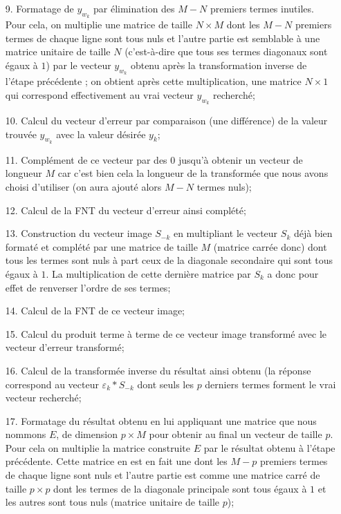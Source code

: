 \begin{itemize}
\begin{itemize}
\item[9.] Formatage de $ y_{w_{k}} $ par élimination des $ M-N $ premiers termes inutiles. Pour cela, on multiplie une matrice de taille $ N\times M $ dont les $ M-N $ premiers termes de chaque ligne sont tous nuls et l'autre partie est semblable à une matrice unitaire de taille $ N $ (c'est-à-dire que tous ses termes diagonaux sont égaux à $ 1 $) par le vecteur $ y_{w_{k}} $ obtenu après la transformation inverse de l'étape précédente ; on obtient après cette multiplication, une matrice $ N\times 1 $ qui correspond effectivement au vrai vecteur $ y_{w_{k}} $ recherché;
\item[10.] Calcul du vecteur d'erreur par comparaison (une différence) de la valeur trouvée $ y_{w_{k}} $ avec la valeur désirée $ y_{k} $;
\item[11.] Complément de ce vecteur par des 0 jusqu'à obtenir un vecteur de longueur $ M $ car c'est bien cela la longueur de la transformée que nous avons choisi d'utiliser (on aura ajouté alors $ M-N $ termes nuls);
\item[12.] Calcul de la FNT du vecteur d'erreur ainsi complété;
\item[13.] Construction du vecteur image $ S_{-k} $ en multipliant le vecteur $ S_{k} $ déjà bien formaté et complété par une matrice de taille $ M $ (matrice carrée donc) dont tous les termes sont nuls à part ceux de la diagonale secondaire qui sont tous égaux à $ 1 $. La multiplication de cette dernière matrice par $ S_{k} $ a donc pour effet de renverser l'ordre de ses termes;
\item[14.] Calcul de la FNT de ce vecteur image;
\item[15.] Calcul du produit terme à terme de ce vecteur image transformé avec le vecteur d'erreur transformé;
\item[16.] Calcul de la transformée inverse du résultat ainsi obtenu (la réponse correspond au vecteur $ \varepsilon_{k}\ast S_{-k} $ dont seuls les $ p $ derniers termes forment le vrai vecteur recherché;
\item[17.] Formatage du résultat obtenu en lui appliquant une matrice que nous nommons $ E $, de dimension $ p\times M $ pour obtenir au final un vecteur de taille $ p $. Pour cela on multiplie la matrice construite $ E $ par le résultat obtenu à l'étape précédente. Cette matrice en est en fait une dont les $ M-p $ premiers termes de chaque ligne sont nuls et l'autre partie est comme une matrice carré de taille $ p\times p $ dont les termes de la diagonale principale sont tous égaux à $ 1 $ et les autres sont tous nuls (matrice unitaire de taille $ p $);

\end{itemize}
\end{itemize}
